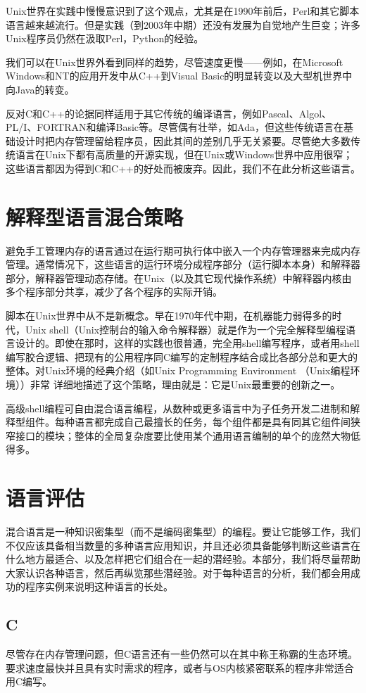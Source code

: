 \documentclass[12pt,oneside]{book}
\begin{document}
\begin{common-format}
Unix世界在实践中慢慢意识到了这个观点，尤其是在1990年前后，Perl和其它脚本语言越来越流行。但是实践（到2003年中期）还没有发展为自觉地产生巨变；许多Unix程序员仍然在汲取Perl，Python的经验。

我们可以在Unix世界外看到同样的趋势，尽管速度更慢——例如，在Microsoft Windows和NT的应用开发中从C++到Visual Basic的明显转变以及大型机世界中向Java的转变。

反对C和C++的论据同样适用于其它传统的编译语言，例如Pascal、Algol、PL/I、FORTRAN和编译Basic等。尽管偶有壮举，如Ada，但这些传统语言在基础设计时把内存管理留给程序员，因此其间的差别几乎无关紧要。尽管绝大多数传统语言在Unix下都有高质量的开源实现，但在Unix或Windows世界中应用很窄；这些语言都因为得到C和C++的好处而被废弃。因此，我们不在此分析这些语言。


\section{解释型语言混合策略}
避免手工管理内存的语言通过在运行期可执行体中嵌入一个内存管理器来完成内存管理。通常情况下，这些语言的运行环境分成程序部分（运行脚本本身）和解释器部分，解释器管理动态存储。在Unix（以及其它现代操作系统）中解释器内核由多个程序部分共享，减少了各个程序的实际开销。

脚本在Unix世界中从不是新概念。早在1970年代中期，在机器能力弱得多的时代，Unix shell（Unix控制台的输入命令解释器）就是作为一个完全解释型编程语言设计的。即使在那时，这样的实践也很普通，完全用shell编写程序，或者用shell编写胶合逻辑、把现有的公用程序同C编写的定制程序结合成比各部分总和更大的整体。对Unix环境的经典介绍（如Unix Programming Environment （Unix编程环境）\cite{Kernighan-Pike84}）非常
详细地描述了这个策略，理由就是：它是Unix最重要的创新之一。

高级shell编程可自由混合语言编程，从数种或更多语言中为子任务开发二进制和解释型组件。每种语言都完成自己最擅长的任务，每个组件都是具有同其它组件间狭窄接口的模块；整体的全局复杂度要比使用某个通用语言编制的单个的庞然大物低得多。

\section{语言评估}
混合语言是一种知识密集型（而不是编码密集型）的编程。要让它能够工作，我们不仅应该具备相当数量的多种语言应用知识，并且还必须具备能够判断这些语言在什么地方最适合、以及怎样把它们组合在一起的潜经验。本部分，我们将尽量帮助大家认识各种语言，然后再纵览那些潜经验。对于每种语言的分析，我们都会用成功的程序实例来说明这种语言的长处。

\subsection{C}
尽管存在内存管理问题，但C语言还有一些仍然可以在其中称王称霸的生态环境。要求速度最快并且具有实时需求的程序，或者与OS内核紧密联系的程序非常适合用C编写。


\end{common-format}
\end{document}
